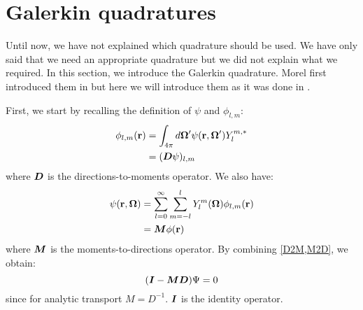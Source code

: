 \section{Galerkin quadratures}
Until now, we have not explained which quadrature should be used. We have only
said that we need an appropriate quadrature but we did not explain what we
required. In this section, we introduce the Galerkin quadrature. Morel
first introduced them in \cite{galerkin_morel} but here we
will introduce them as it was done in \cite{pautz_fp}. 

First, we start by recalling the definition of $\psi$ and $\phi_{l,m}$:
\begin{equation}
  \begin{split}
    \phi_{l,m}(\br) &= \int_{4\pi} d\bo' \psi(\br,\bo') Y_l^{m,*}\\
                    &=(\bs{D} \psi)_{l,m}
  \end{split}
  \label{D2M}
\end{equation}
where $\boldsymbol{D}$ is the directions-to-moments operator. We also have:
\begin{equation}
  \begin{split}
    \psi(\br,\bo) &= \sum_{l=0}^{\infty} \sum_{m=-l}^l Y_l^m(\bo)\phi_{l,m}(\br)\\
                  &= \bs{M}\phi(\br)
  \end{split}
  \label{M2D}
\end{equation}
where $\boldsymbol{M}$ is the moments-to-directions operator. By combining \cref{D2M,M2D}, 
we obtain:
\begin{equation}
  (\bs{I}-\bs{MD})\Psi = 0
  \label{identity_alpha}
\end{equation}
since for analytic transport $M=D^{-1}$. $\boldsymbol{I}$ is the identity operator.

